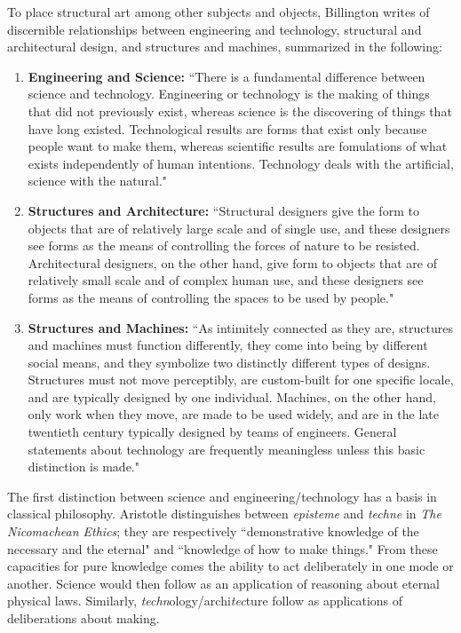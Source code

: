 To place structural art among other subjects and objects, Billington writes of discernible relationships between engineering and technology, structural and architectural design, and structures and machines, summarized in the following:

\begin{enumerate}
  \item [] \textbf{Engineering and Science:} ``There is a fundamental difference between science and technology. Engineering or technology is the making of things that did not previously exist, whereas science is the discovering of things that have long existed. Technological results are forms that exist only because people want to make them, whereas scientific results are fomulations of what exists independently of human intentions. Technology deals with the artificial, science with the natural."\cite[p9]{TOWERANDBRIDGE}

  \item [] \textbf{Structures and Architecture:} ``Structural designers give the form to objects that are of relatively large scale and of single use, and these designers see forms as the means of controlling the forces of nature to be resisted. Architectural designers, on the other hand, give form to objects that are of relatively small scale and of complex human use, and these designers see forms as the means of controlling the spaces to be used by people." \cite[14]{TOWERANDBRIDGE}

  \item[] \textbf{Structures and Machines:} ``As intimitely connected as they are, structures and machines must function differently, they come into being by different social means, and they symbolize two distinctly different types of designs. Structures must not move perceptibly, are custom-built for one specific locale, and are typically designed by one individual. Machines, on the other hand, only work when they move, are made to be used widely, and are in the late twentieth century typically designed by teams of engineers. General statements about technology are frequently meaningless unless this basic distinction is made."\cite[p13]{TOWERANDBRIDGE}

\end{enumerate}

The first distinction between science and engineering/technology has a basis in classical philosophy. Aristotle distinguishes between \textit{episteme} and \textit{techne} in \textit{The Nicomachean Ethics}; they are respectively ``demonstrative knowledge of the necessary and the eternal" and ``knowledge of how to make things." \cite[p104, 105]{NICOMACHEANETHICS} From these capacities for pure knowledge comes the ability to act deliberately in one mode or another. Science would then follow as an application of reasoning about eternal physical laws. Similarly, \textit{techn}ology/archi\textit{tec}ture follow as applications of deliberations about making.

